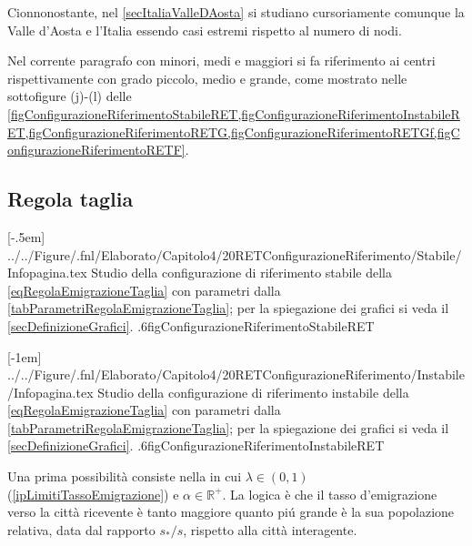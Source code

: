     Cionnonostante, nel \cref{secItaliaValleDAosta} si studiano cursoriamente comunque la Valle d'Aosta e l'Italia essendo casi estremi rispetto al numero di nodi.

    \begin{oss}
      Nel corrente paragrafo con minori, medi e maggiori si fa riferimento ai centri rispettivamente con grado piccolo, medio e grande, come mostrato nelle sottofigure (j)-(l) delle \cref{figConfigurazioneRiferimentoStabileRET,figConfigurazioneRiferimentoInstabileRET,figConfigurazioneRiferimentoRETG,figConfigurazioneRiferimentoRETGf,figConfigurazioneRiferimentoRETF}.
    \end{oss}
      
    \subsection{Regola taglia}\label{secRET}

      [-.5em]
        {../../Figure/.fnl/Elaborato/Capitolo4/20RETConfigurazioneRiferimento/Stabile/Infopagina.tex}
        {Studio della configurazione di riferimento stabile della \ref{eqRegolaEmigrazioneTaglia} con parametri dalla \cref{tabParametriRegolaEmigrazioneTaglia}; per la spiegazione dei grafici si veda il \cref{secDefinizioneGrafici}.}
        {.6\linewidth}{figConfigurazioneRiferimentoStabileRET}

      [-1em]
        {../../Figure/.fnl/Elaborato/Capitolo4/20RETConfigurazioneRiferimento/Instabile/Infopagina.tex}
        {Studio della configurazione di riferimento instabile della \ref{eqRegolaEmigrazioneTaglia} con parametri dalla \cref{tabParametriRegolaEmigrazioneTaglia}; per la spiegazione dei grafici si veda il \cref{secDefinizioneGrafici}.}
        {.6\linewidth}{figConfigurazioneRiferimentoInstabileRET}

      Una prima possibilità\footnotemark{} consiste nella%
      in cui \(\lambda\in(0,1)\) (\cref{ipLimitiTassoEmigrazione}) e \(\alpha\in\mathbb R^+\). La logica è che il tasso d'emigrazione verso la città ricevente è tanto maggiore quanto piú grande è la sua popolazione relativa, data dal rapporto \(s_*/s\), rispetto alla città interagente.

